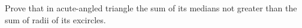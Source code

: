 \problem{}
Prove that in acute-angled triangle the sum of its medians not greater than the sum of radii of its excircles.

\solution

\endproblem
